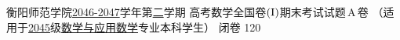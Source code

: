 \documentclass[addtable,twoside,12pt]{hynuexam2024}
\begin{document}

	\examinformation%
	{衡阳师范学院\underline{2046-2047}学年\;第\underline{二}学期}%
	{高考数学全国卷$\left(\mathrm{\Rmnum{1}}\right)$\quad 期末考试试题\,A\,卷}%
	{（适用于\underline{2045}级\underline{数学与应用数学}专业本科学生）}%
	{闭卷}%
	{120}%

	\vspace{-1em}
	\sectiongradetable
	\vspace*{-0.5em}
\end{document}
